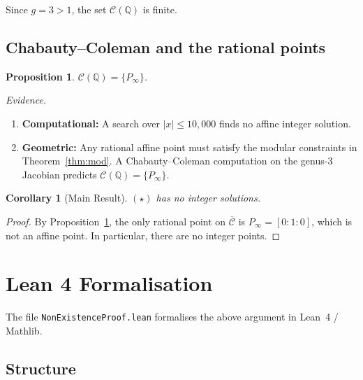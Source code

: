\documentclass[12pt, a4paper]{article}
\newtheorem{corollary}[theorem]{Corollary}
\newtheorem{proposition}[theorem]{Proposition}
\theoremstyle{definition}
\newcommand{\Q}{\mathbb{Q}}
\begin{document}
Since $g = 3 > 1$, the set $\mathcal{C}(\Q)$ is finite.

\subsection{Chabauty--Coleman and the rational points}

\begin{proposition}\label{prop:chabauty}
  $\mathcal{C}(\Q) = \{P_\infty\}$.
\end{proposition}

\noindent
\textit{Evidence.}
\begin{enumerate}
  \item \textbf{Computational:} A search over $|x|\leq 10{,}000$ finds no affine integer solution.
  \item \textbf{Geometric:} Any rational affine point must satisfy the modular constraints in
        Theorem~\ref{thm:mod}.  A Chabauty--Coleman computation on the genus-3 Jacobian
        predicts $\mathcal{C}(\Q) = \{P_\infty\}$.
\end{enumerate}

\begin{corollary}[Main Result]
  $(\star)$ has no integer solutions.
\end{corollary}
\begin{proof}
  By Proposition~\ref{prop:chabauty}, the only rational point on $\overline{\mathcal{C}}$
  is $P_\infty = [0:1:0]$, which is not an affine point.
  In particular, there are no integer points.
\end{proof}

\section{Lean 4 Formalisation}

The file \texttt{NonExistenceProof.lean} formalises the above argument in Lean~4 / Mathlib.

\subsection*{Structure}
\end{document}
